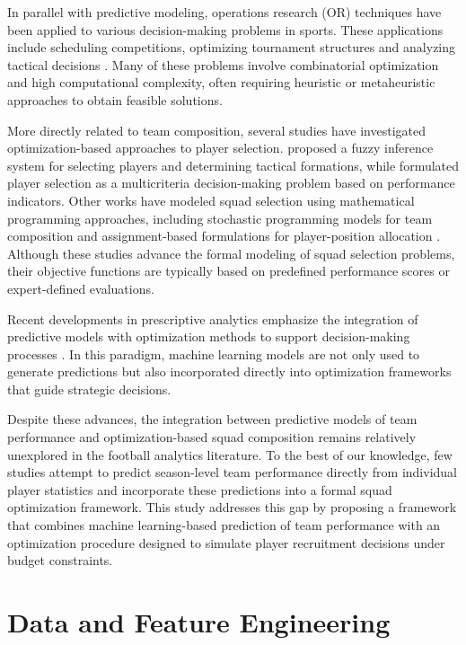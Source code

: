 \documentclass[a4paper,fleqn]{cas-sc}
\begin{document}
In parallel with predictive modeling, operations research (OR) techniques have been applied to various decision-making problems in sports. 
These applications include scheduling competitions, optimizing tournament structures and analyzing tactical decisions \cite{Kendall2010}. 
Many of these problems involve combinatorial optimization and high computational complexity, often requiring heuristic or metaheuristic approaches 
to obtain feasible solutions.

More directly related to team composition, several studies have investigated optimization-based approaches to player selection. \cite{Tavana2013} 
proposed a fuzzy inference system for selecting players and determining tactical formations, while \cite{Qader2017} formulated player selection as a 
multicriteria decision-making problem based on performance indicators. Other works have modeled squad selection using mathematical programming approaches, 
including stochastic programming models for team composition \cite{Pantuso2017} and assignment-based formulations for player-position allocation \cite{Boon2003}. 
Although these studies advance the formal modeling of squad selection problems, their objective functions are typically based on 
predefined performance scores or expert-defined evaluations.

Recent developments in prescriptive analytics emphasize the integration of predictive models with optimization methods to support decision-making processes 
\cite{Bertsimas2019}. In this paradigm, machine learning models are not only used to generate predictions but also incorporated directly 
into optimization frameworks that guide strategic decisions.

Despite these advances, the integration between predictive models of team performance and optimization-based squad composition remains 
relatively unexplored in the football analytics literature. To the best of our knowledge, few studies attempt to predict season-level team 
performance directly from individual player statistics and incorporate these predictions into a formal squad optimization framework.
This study addresses this gap by proposing a framework that combines machine learning-based prediction of team performance with an 
optimization procedure designed to simulate player recruitment decisions under budget constraints.

\section{Data and Feature Engineering}
\end{document}
